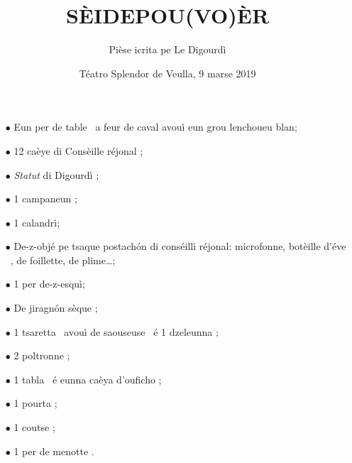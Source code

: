 \title{SÈIDEPOU(VO)ÈR}
\author{Pièse icrita pe Le Digourdì}
\date{Téatro Splendor de Veulla, 9 marse 2019}

\maketitle






\Scenographie
\begin{itemize}
\item[$\bullet$] Eun per de table \tabla\ a feur de caval avouì eun grou lenchoueu blan;
\item[$\bullet$] 12 caèye di Consèille réjonal \sedia ;
\item[$\bullet$] \textit{Statut} di Digourdì \livro ;
\item[$\bullet$] 1 campaneun \campanel ;
\item[$\bullet$]1 calandrì;
\item[$\bullet$] De-z-objé pe tsaque postach\'on di conséillì réjonal: microfonne, botèille d'éve \boteilledeve\ , de foillette, de plime\ldots ;
\item[$\bullet$] 1 per de-z-esquì\eski ;
\item[$\bullet$] De jiragn\'on sèque \frappe;
\item[$\bullet$] 1 tsaretta \tsaretta\ avouì de saouseuse \salan\ é 1 dzeleunna \gallina ;
\item[$\bullet$] 2 poltronne \poltrona ;
\item[$\bullet$] 1 tabla \tabla\ é eunna caèya d'ouficho \sedia ;
\item [$\bullet$] 1 pourta \porta ;
\item [$\bullet$] 1 coutse  ;
\item [$\bullet$] 1 per de menotte \manette .
\end{itemize}

\setlength{\lengthchar}{3.75cm}

